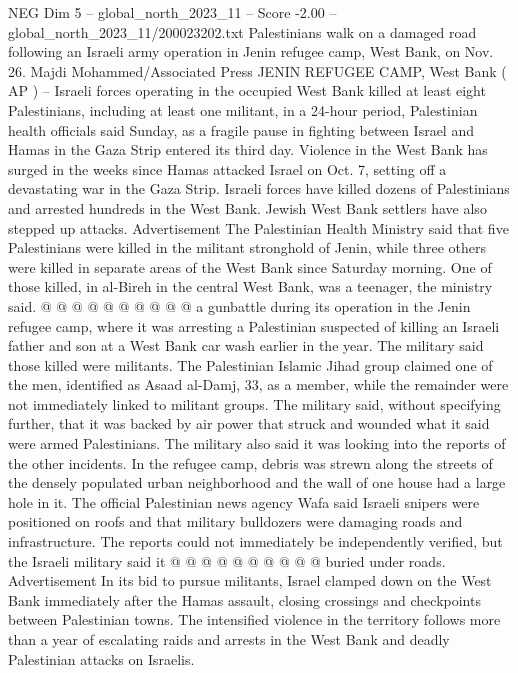 \begin{textsample}{NEG Dim 5 – global\_north\_2023\_11 – Score -2.00 – global\_north\_2023\_11/200023202.txt}  \label{ex:f5_neg_040}
Palestinians walk on a damaged road following an Israeli army operation in Jenin refugee camp, West Bank, on Nov. 26.
Majdi Mohammed/Associated Press JENIN REFUGEE CAMP, West Bank ( AP ) -- Israeli forces operating in the occupied West Bank killed at least eight Palestinians, including at least one militant, in a 24-hour period, Palestinian health officials said Sunday, as a fragile pause in fighting between Israel and Hamas in the Gaza Strip entered its third day.
Violence in the West Bank has surged in the weeks since Hamas attacked Israel on Oct. 7, setting off a devastating war in the Gaza Strip.
Israeli forces have killed dozens of Palestinians and arrested hundreds in the West Bank.
Jewish West Bank settlers have also stepped up attacks.
Advertisement The Palestinian Health Ministry said that five Palestinians were killed in the militant stronghold of Jenin, while three others were killed in separate areas of the West Bank since Saturday morning.
One of those killed, in al-Bireh in the central West Bank, was a teenager, the ministry said. @ @ @ @ @ @ @ @ @ @ a gunbattle during its operation in the Jenin refugee camp, where it was arresting a Palestinian suspected of killing an Israeli father and son at a West Bank car wash earlier in the year.
The military said those killed were militants.
The Palestinian Islamic Jihad group claimed one of the men, identified as Asaad al-Damj, 33, as a member, while the remainder were not immediately linked to militant groups.
The military said, without specifying further, that it was backed by air power that struck and wounded what it said were armed Palestinians.
The military also said it was looking into the reports of the other incidents.
In the refugee camp, debris was strewn along the streets of the densely populated urban neighborhood and the wall of one house had a large hole in it.
The official Palestinian news agency Wafa said Israeli snipers were positioned on roofs and that military bulldozers were damaging roads and infrastructure.
The reports could not immediately be independently verified, but the Israeli military said it @ @ @ @ @ @ @ @ @ @ buried under roads.
Advertisement In its bid to pursue militants, Israel clamped down on the West Bank immediately after the Hamas assault, closing crossings and checkpoints between Palestinian towns.
The intensified violence in the territory follows more than a year of escalating raids and arrests in the West Bank and deadly Palestinian attacks on Israelis.

\end{textsample}
